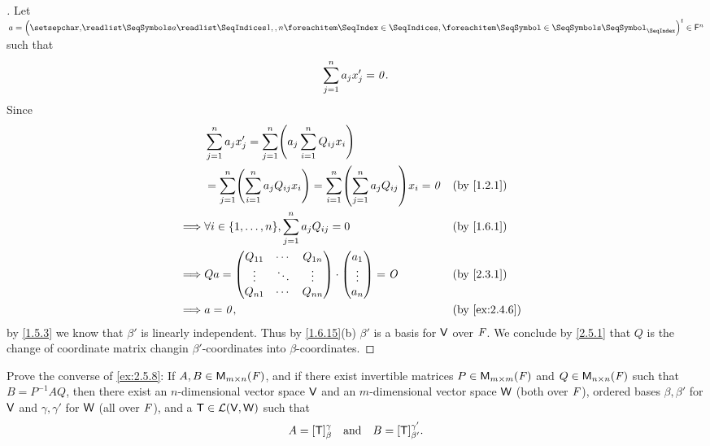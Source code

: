 \begin{proof}[]
	Let \(a = \tp{\tuple{a}{1,,n}} \in \vs{F}^n\) such that
	\[
		\sum_{j = 1}^n a_j x_j' = \mathit{0}.
	\]
	Since
	\begin{align*}
		         & \sum_{j = 1}^n a_j x_j' = \sum_{j = 1}^n \pa{a_j \sum_{i = 1}^n Q_{i j} x_i}                                                             \\
		         & = \sum_{j = 1}^n \pa{\sum_{i = 1}^n a_j Q_{i j} x_i} = \sum_{i = 1}^n \pa{\sum_{j = 1}^n a_j Q_{i j}} x_i = \zv &  & \by{1.2.1}          \\
		\implies & \forall i \in \set{1, \dots, n}, \sum_{j = 1}^n a_j Q_{i j} = 0                                                 &  & \by{1.6.1}          \\
		\implies & Qa = \begin{pmatrix}
			                Q_{1 1} & \cdots & Q_{1 n} \\
			                \vdots  & \ddots & \vdots  \\
			                Q_{n 1} & \cdots & Q_{n n}
		                \end{pmatrix} \cdot \begin{pmatrix}
			                                    a_1    \\
			                                    \vdots \\
			                                    a_n
		                                    \end{pmatrix} = \zm                                                                             &  & \by{2.3.1} \\
		\implies & a = \zv,                                                                                                        &  & \by{ex:2.4.6}
	\end{align*}
	by \cref{1.5.3} we know that \(\beta'\) is linearly independent.
	Thus by \cref{1.6.15}(b) \(\beta'\) is a basis for \(\mathsf{V}\) over \(\mathit{F}\).
	We conclude by \cref{2.5.1} that \(Q\) is the change of coordinate matrix changin \(\beta'\)-coordinates into \(\beta\)-coordinates.
\end{proof}

\begin{ex}\label{ex:2.5.14}
	Prove the converse of \cref{ex:2.5.8}:
	If \(A, B \in \MS\), and if there exist invertible matrices \(P \in \ms[m][m][\F]\) and \(Q \in \ms[n][n][\F]\) such that \(B = P^{-1} A Q\), then there exist an \(n\)-dimensional vector space \(\mathsf{V}\) and an \(m\)-dimensional vector space \(\mathsf{W}\) (both over \(\mathit{F}\)), ordered bases \(\beta, \beta'\) for \(\mathsf{V}\) and \(\gamma, \gamma'\) for \(\mathsf{W}\) (all over \(\mathit{F}\)), and a \(\mathsf{T} \in \mathcal{L}(\mathsf{V}, \mathsf{W})\) such that
	\[
		A = [\mathsf{T}]_{\beta}^{\gamma} \quad \text{and} \quad B = [\mathsf{T}]_{\beta'}^{\gamma'}.
	\]
\end{ex}

